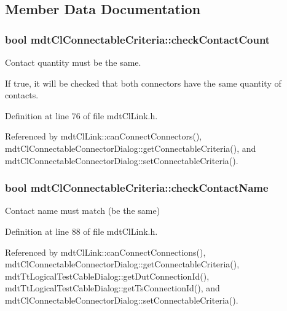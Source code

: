 \subsection{Member Data Documentation}
\hypertarget{structmdt_cl_connectable_criteria_a96b240355fc97c31a72eba946614e261}{
\subsubsection[{check\-Contact\-Count}]{\setlength{\rightskip}{0pt plus 5cm}bool mdt\-Cl\-Connectable\-Criteria\-::check\-Contact\-Count}}\label{structmdt_cl_connectable_criteria_a96b240355fc97c31a72eba946614e261}


Contact quantity must be the same. 

If true, it will be checked that both connectors have the same quantity of contacts. 

Definition at line 76 of file mdt\-Cl\-Link.\-h.



Referenced by mdt\-Cl\-Link\-::can\-Connect\-Connectors(), mdt\-Cl\-Connectable\-Connector\-Dialog\-::get\-Connectable\-Criteria(), and mdt\-Cl\-Connectable\-Connector\-Dialog\-::set\-Connectable\-Criteria().

\hypertarget{structmdt_cl_connectable_criteria_a216681c69f5674cf5011bc00cd0170dd}{
\subsubsection[{check\-Contact\-Name}]{\setlength{\rightskip}{0pt plus 5cm}bool mdt\-Cl\-Connectable\-Criteria\-::check\-Contact\-Name}}\label{structmdt_cl_connectable_criteria_a216681c69f5674cf5011bc00cd0170dd}


Contact name must match (be the same) 



Definition at line 88 of file mdt\-Cl\-Link.\-h.



Referenced by mdt\-Cl\-Link\-::can\-Connect\-Connections(), mdt\-Cl\-Connectable\-Connector\-Dialog\-::get\-Connectable\-Criteria(), mdt\-Tt\-Logical\-Test\-Cable\-Dialog\-::get\-Dut\-Connection\-Id(), mdt\-Tt\-Logical\-Test\-Cable\-Dialog\-::get\-Ts\-Connection\-Id(), and mdt\-Cl\-Connectable\-Connector\-Dialog\-::set\-Connectable\-Criteria().

